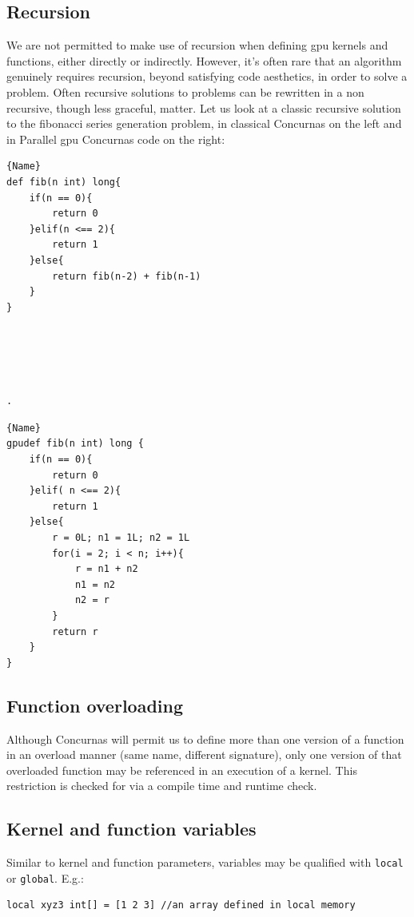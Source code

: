 \documentclass[conc-doc]{subfiles}
\begin{document}
\subsection{Recursion}
We are not permitted to make use of recursion when defining gpu kernels and functions, either directly or indirectly. However, it's often rare that an algorithm genuinely requires recursion, beyond satisfying code aesthetics, in order to solve a problem. Often recursive solutions to problems can be rewritten in a non recursive, though less graceful, matter. Let us look at a classic recursive solution to the fibonacci series generation problem, in classical Concurnas on the left and in Parallel gpu Concurnas code on the right:

\noindent
\begin{minipage}{.45\textwidth}
	\begin{lstlisting}[caption=Classical Concurnas code,frame=tlrb]{Name}
def fib(n int) long{
	if(n == 0){
		return 0
	}elif(n <== 2){
		return 1
	}else{
		return fib(n-2) + fib(n-1)
	}
}





.
\end{lstlisting}
\end{minipage}\hfill
\begin{minipage}{.45\textwidth}
	\begin{lstlisting}[caption=Parallel GPU Concurnas code,frame=tlrb]{Name}
gpudef fib(n int) long {
	if(n == 0){
		return 0
	}elif( n <== 2){
		return 1
	}else{
		r = 0L; n1 = 1L; n2 = 1L       
		for(i = 2; i < n; i++){
			r = n1 + n2
			n1 = n2
			n2 = r
		}
		return r
	}	
}
\end{lstlisting}
\end{minipage}

\subsection{Function overloading}
Although Concurnas will permit us to define more than one version of a function in an overload manner (same name, different signature), only one version of that overloaded function may be referenced in an execution of a kernel. This restriction is checked for via a compile time and runtime check.

\subsection{Kernel and function variables}
Similar to kernel and function parameters, variables may be qualified with \lstinline{local} or \lstinline{global}. E.g.:
\begin{lstlisting}
local xyz3 int[] = [1 2 3] //an array defined in local memory
\end{lstlisting}
\end{document}

